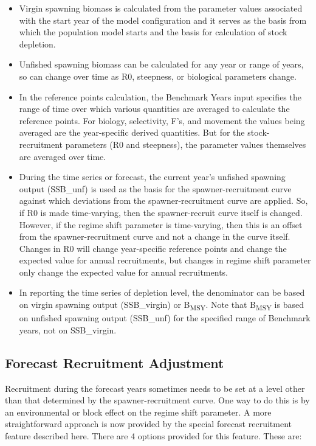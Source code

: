 \begin{itemize}
	\item Virgin spawning biomass is calculated from the parameter values associated with the start year of the model configuration and it serves as the basis from which the population model starts and the basis for calculation of stock depletion.
	
	\item Unfished spawning biomass can be calculated for any year or range of years, so can change over time as R0, steepness, or biological parameters change.
	
	\item In the reference points calculation, the Benchmark Years input specifies the range of time over which various quantities are averaged to calculate the reference points.  For biology, selectivity, F's, and movement the values being averaged are the year-specific derived quantities.  But for the stock-recruitment parameters (R0 and steepness), the parameter values themselves are averaged over time.
	
	\item During the time series or forecast, the current year's unfished spawning output (SSB\_unf) is used as the basis for the spawner-recruitment curve against which deviations from the spawner-recruitment curve are applied.  So, if R0 is made time-varying, then the spawner-recruit curve itself is changed.  However, if the regime shift parameter is time-varying, then this is an offset from the spawner-recruitment curve and not a change in the curve itself.  Changes in R0 will change year-specific reference points and change the expected value for annual recruitments, but changes in regime shift parameter only change the expected value for annual recruitments.
	
	\item In reporting the time series of depletion level, the denominator can be based on virgin spawning output (SSB\_virgin) or B\textsubscript{MSY}.  Note that B\textsubscript{MSY} is based on unfished spawning output (SSB\_unf) for the specified range of Benchmark years, not on SSB\_virgin.
\end{itemize}


\hypertarget{ForeSpawn}{}
\subsection{Forecast Recruitment Adjustment}
Recruitment during the forecast years sometimes needs to be set at a level other than that determined by the spawner-recruitment curve.  One way to do this is by an environmental or block effect on the regime shift parameter.  A more straightforward approach is now provided by the special forecast recruitment feature described here. There are 4 options provided for this feature.  These are:

